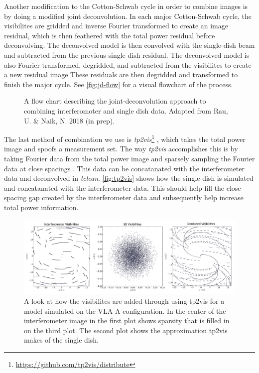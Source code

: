 \documentclass[manuscript,linenumbers]{aastex62}
\begin{document}
Another modification to the Cotton-Schwab cycle in order to combine images is by doing a modified joint deconvolution. In each major Cotton-Schwab cycle, the visibilites are gridded and inverse Fourier transformed to create an image residual, which is then feathered with the total power residual before deconvolving. The deconvolved model is then convolved with the single-dish beam and subtracted from the previous single-dish residual. The deconvolved model is also Fourier transformed, degridded, and subtracted from the visibilites to create a new residual image These residuals are then degridded and transformed to finish the major cycle. See \autoref{fig:jd-flow} for a visual flowchart of the process.

\begin{figure}[t]
    \caption{A flow chart describing the joint-deconvolution approach to combining interferomoter and single dish data. Adapted from Rau, U. \& Naik, N. 2018 (in prep).}
    \label{fig:jd-flow}
\end{figure}

The last method of combination we use is \textit{tp2vis}\footnote{\url{https://github.com/tp2vis/distribute}} , which takes the total power image and spoofs a measurement set. The way \textit{tp2vis} accomplishes this is by taking Fourier data from the total power image and sparsely sampling the Fourier data at close spacings \citep[see][]{2011ApJS..193...19K}. This data can be concatanated with the interferometer data and deconvolved in \textit{tclean}. \autoref{fig:tp2vis} shows how the single-dish is simulated and concatanated with the interferometer data. This should help fill the close-spacing gap created by the interferometer data and subsequently help increase total power information.

\begin{figure}[t]
    \includegraphics[width=\textwidth]{figures/tp2vis}
    \caption{A look at how the visibilites are added through using tp2vis for a model simulated on the VLA A configuration. In the center of the interferometer image in the first plot shows sparsity that is filled in on the third plot. The second plot shows the approximation tp2vis makes of the single dish.}
    \label{fig:tp2vis}
\end{figure}
\end{document}
